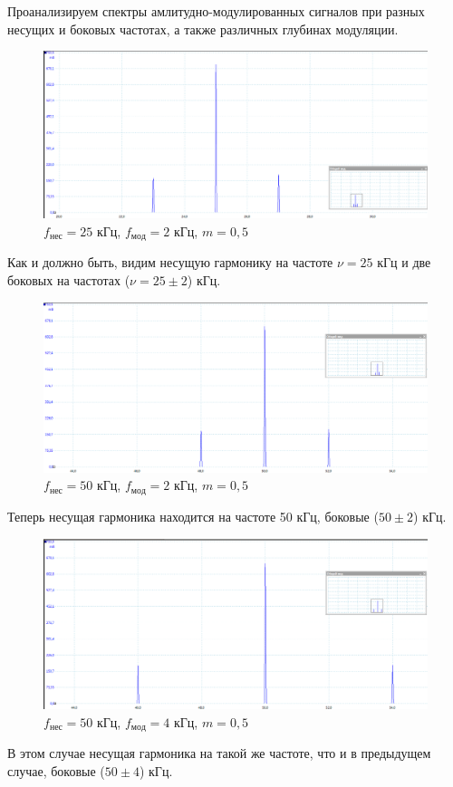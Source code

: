 \documentclass[a4paper,12pt]{article}
\begin{document}
Проанализируем спектры амлитудно-модулированных сигналов при разных несущих и боковых частотах, а также различных глубинах модуляции.
\begin{figure}[H]\label{fig: nu_AM_25kHz_nu_0}
    \centering
    \includegraphics[width = \textwidth]{nu_AM_25kHz_nu_0.png}
    \caption{$f_{нес} = 25$ кГц, $f_{мод} = 2$ кГц, $m = 0,5$}
\end{figure}
Как и должно быть, видим несущую гармонику на частоте $\nu = 25$ кГц и две боковых на частотах ($\nu = 25 \pm 2$) кГц.
\begin{figure}[H]\label{fig: nu_AM_50kHz_nu_0}
    \centering
    \includegraphics[width = \textwidth]{nu_AM_50kHz_nu_0.png}
    \caption{$f_{нес} = 50$ кГц, $f_{мод} = 2$ кГц, $m = 0,5$}
\end{figure}
Теперь несущая гармоника находится на частоте 50 кГц, боковые ($50 \pm 2$) кГц.

\begin{figure}[H]\label{fig: nu_AM_50kHz_nu_4kHz}
    \centering
    \includegraphics[width = \textwidth]{nu_AM_50kHz_nu_mod.png}
    \caption{$f_{нес} = 50$ кГц, $f_{мод} = 4$ кГц, $m = 0,5$}
\end{figure}
В этом случае несущая гармоника на такой же частоте, что и в предыдущем случае, боковые ($50 \pm 4$) кГц.
\end{document}
